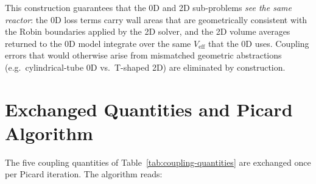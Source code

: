 \documentclass[11pt,a4paper]{report}
\begin{document}
This construction guarantees that the 0D and 2D sub-problems \emph{see the same reactor}: the 0D loss terms carry wall areas that are geometrically consistent with the Robin boundaries applied by the 2D solver, and the 2D volume averages returned to the 0D model integrate over the same $V_\mathrm{eff}$ that the 0D uses.  Coupling errors that would otherwise arise from mismatched geometric abstractions (e.g.\ cylindrical-tube 0D vs.\ T-shaped 2D) are eliminated by construction.

\section{Exchanged Quantities and Picard Algorithm}
\label{sec:hybrid-algo}

The five coupling quantities of Table~\ref{tab:coupling-quantities} are exchanged once per Picard iteration.  The algorithm reads:
\end{document}
